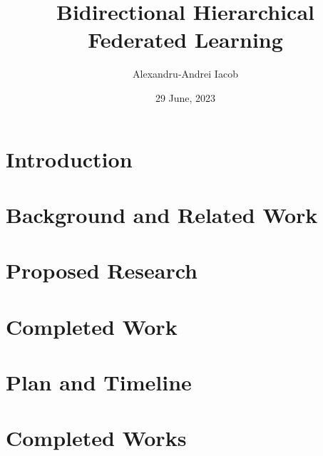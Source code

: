 \documentclass[times, withindex, backrefs, firstyr]{cam-thesis}
\title{Bidirectional Hierarchical Federated Learning}
\author{Alexandru-Andrei Iacob}
\date{29 June, 2023}
\begin{document}
\frontmatter{}
\chapter{Introduction}

\chapter{Background and Related Work}\label{sec:back}

\chapter{Proposed Research}\label{sec:proposal}

\chapter{Completed Work}\label{sec:completed_work}

\chapter{Plan and Timeline}\label{sec:timeplan}



\renewcommand{\bibname}{References}
\cleardoublepage
{}
{}






\appendix

\chapter{Completed Works}







\printthesisindex
\end{document}
